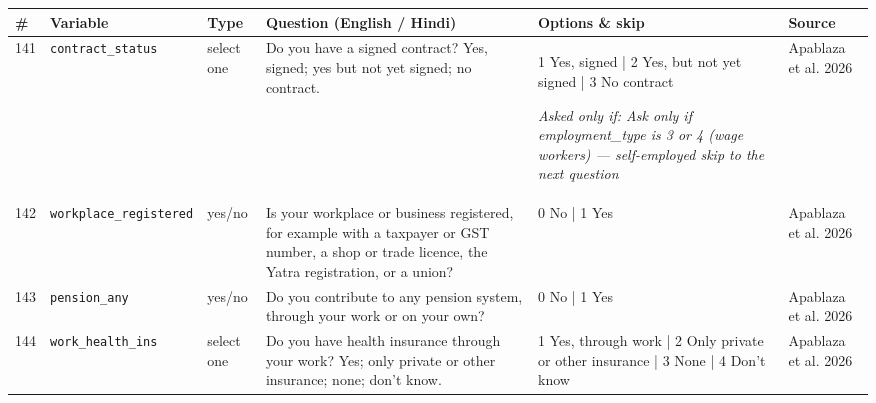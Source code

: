 \documentclass[9pt,a4paper,landscape]{article}
\begin{document}
\begin{longtable}{@{}p{0.5cm}p{3.3cm}p{1.7cm}p{7.3cm}p{5.6cm}p{5.4cm}@{}}
\toprule \footnotesize\textbf{\#} & \footnotesize\textbf{Variable} & \footnotesize\textbf{Type} & \footnotesize\textbf{Question (English / Hindi)} & \footnotesize\textbf{Options {\&} skip} & \footnotesize\textbf{Source}\\ \midrule
\endhead
\footnotesize 141 & \footnotesize\texttt{contract\_status} & \scriptsize select one & \footnotesize Do you have a signed contract? Yes, signed; yes but not yet signed; no contract.\par\vspace{1pt}{\footnotesize\color{hdr}{\hifont क्या आपका दस्तख़त किया हुआ अनुबंध (कॉन्ट्रैक्ट) है? हाँ, दस्तख़त किया; हाँ, पर अभी दस्तख़त नहीं हुआ; कोई अनुबंध नहीं।}} & \scriptsize 1 Yes, signed | 2 Yes, but not yet signed | 3 No contract\par\vspace{1pt}\textit{Asked only if: Ask only if employment\_type is 3 or 4 (wage workers) — self-employed skip to the next question} & \scriptsize Apablaza et al. 2026\\
\footnotesize 142 & \footnotesize\texttt{workplace\_registered} & \scriptsize yes/no & \footnotesize Is your workplace or business registered, for example with a taxpayer or GST number, a shop or trade licence, the Yatra registration, or a union?\par\vspace{1pt}{\footnotesize\color{hdr}{\hifont क्या आपका काम या धंधा रजिस्टर्ड है, जैसे GST या टैक्स नंबर, दुकान का लाइसेंस, यात्रा का रजिस्ट्रेशन, या कोई यूनियन?}} & \scriptsize 0 No | 1 Yes & \scriptsize Apablaza et al. 2026\\
\footnotesize 143 & \footnotesize\texttt{pension\_any} & \scriptsize yes/no & \footnotesize Do you contribute to any pension system, through your work or on your own?\par\vspace{1pt}{\footnotesize\color{hdr}{\hifont क्या आप किसी पेंशन में पैसा डालते हैं, अपने काम से या अपनी मर्ज़ी से?}} & \scriptsize 0 No | 1 Yes & \scriptsize Apablaza et al. 2026\\
\footnotesize 144 & \footnotesize\texttt{work\_health\_ins} & \scriptsize select one & \footnotesize Do you have health insurance through your work? Yes; only private or other insurance; none; don't know.\par\vspace{1pt}{\footnotesize\color{hdr}{\hifont क्या काम की तरफ़ से आपका स्वास्थ्य बीमा है? हाँ; सिर्फ़ अपना या कोई और बीमा; कोई नहीं; पता नहीं।}} & \scriptsize 1 Yes, through work | 2 Only private or other insurance | 3 None | 4 Don't know & \scriptsize Apablaza et al. 2026\\

\end{longtable}
\end{document}
